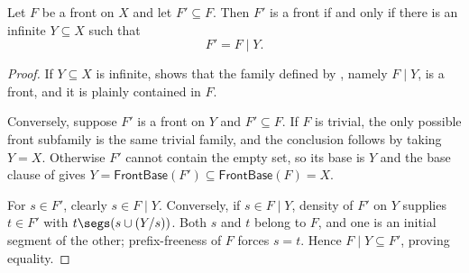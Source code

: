 \begin{lemma}
Let $F$ be a front on $X$ and let $F'\subseteq F$.  Then $F'$ is a front
if and only if there is an infinite $Y\subseteq X$ such that
\[
F'=F\mathbin{|}Y.
\]
\end{lemma}
\begin{proof}
If $Y\subseteq X$ is infinite,  shows that the
family defined by , namely $F\mathbin{|}Y$, is a
front, and it is plainly contained in $F$.

Conversely, suppose $F'$ is a front on $Y$ and $F'\subseteq F$.  If $F$ is
trivial, the only possible front subfamily is the same trivial family, and
the conclusion follows by taking $Y=X$.  Otherwise $F'$ cannot contain the
empty set, so its base is $Y$ and the base clause of  gives
$Y=\mathsf{FrontBase}(F')\subseteq\mathsf{FrontBase}(F)=X$.

For $s\in F'$, clearly $s\in F\mathbin{|}Y$.  Conversely, if
$s\in F\mathbin{|}Y$, density of $F'$ on $Y$ supplies $t\in F'$ with
$t\segs(s\cup(Y/s))$.  Both $s$ and $t$ belong to $F$, and one is an
initial segment of the other; prefix-freeness of $F$ forces $s=t$.  Hence
$F\mathbin{|}Y\subseteq F'$, proving equality.
\end{proof}

